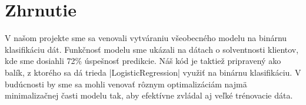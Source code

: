 \documentclass[report.tex]{subfiles}
\begin{document}
	
\section{Zhrnutie}	
	
V našom projekte sme sa venovali vytváraniu všeobecného modelu na binárnu klasifikáciu dát. Funkčnosť modelu sme ukázali na dátach o solventnosti klientov, kde sme dosiahli 72\% úspešnosť predikcie. Náš kód je taktiež pripravený ako balík, z ktorého sa dá trieda \pyth|LogisticRegression| využiť na binárnu klasifikáciu. V budúcnosti by sme sa mohli venovať rôznym optimalizáciám najmä minimalizačnej časti modelu tak, aby efektívne zvládal aj veľké trénovacie dáta. 
\end{document}
